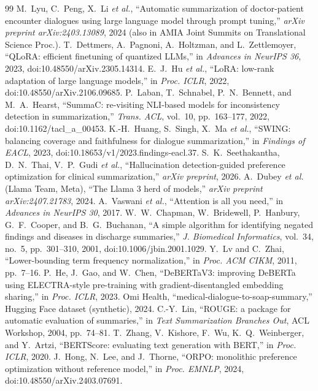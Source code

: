 \documentclass[conference]{IEEEtran}
\begin{document}
\begin{thebibliography}{99}
 M.~Lyu, C.~Peng, X.~Li \emph{et al.}, ``Automatic summarization of doctor-patient encounter dialogues using large language model through prompt tuning,'' \emph{arXiv preprint arXiv:2403.13089}, 2024 (also in AMIA Joint Summits on Translational Science Proc.).
 T.~Dettmers, A.~Pagnoni, A.~Holtzman, and L.~Zettlemoyer, ``QLoRA: efficient finetuning of quantized LLMs,'' in \emph{Advances in NeurIPS 36}, 2023, doi:10.48550/arXiv.2305.14314.
 E.~J.~Hu \emph{et al.}, ``LoRA: low-rank adaptation of large language models,'' in \emph{Proc. ICLR}, 2022, doi:10.48550/arXiv.2106.09685.
 P.~Laban, T.~Schnabel, P.~N.~Bennett, and M.~A.~Hearst, ``SummaC: re-visiting NLI-based models for inconsistency detection in summarization,'' \emph{Trans. ACL}, vol.~10, pp.~163--177, 2022, doi:10.1162/tacl\_a\_00453.
 K.-H.~Huang, S.~Singh, X.~Ma \emph{et al.}, ``SWING: balancing coverage and faithfulness for dialogue summarization,'' in \emph{Findings of EACL}, 2023, doi:10.18653/v1/2023.findings-eacl.37.
 S.~K.~Seethakantha, D.~N.~Thai, V.~P.~Gudi \emph{et al.}, ``Hallucination detection-guided preference optimization for clinical summarization,'' \emph{arXiv preprint}, 2026.
 A.~Dubey \emph{et al.} (Llama Team, Meta), ``The Llama 3 herd of models,'' \emph{arXiv preprint arXiv:2407.21783}, 2024.
 A.~Vaswani \emph{et al.}, ``Attention is all you need,'' in \emph{Advances in NeurIPS 30}, 2017.
 W.~W.~Chapman, W.~Bridewell, P.~Hanbury, G.~F.~Cooper, and B.~G.~Buchanan, ``A simple algorithm for identifying negated findings and diseases in discharge summaries,'' \emph{J. Biomedical Informatics}, vol.~34, no.~5, pp.~301--310, 2001, doi:10.1006/jbin.2001.1029.
 Y.~Lv and C.~Zhai, ``Lower-bounding term frequency normalization,'' in \emph{Proc. ACM CIKM}, 2011, pp.~7--16.
 P.~He, J.~Gao, and W.~Chen, ``DeBERTaV3: improving DeBERTa using ELECTRA-style pre-training with gradient-disentangled embedding sharing,'' in \emph{Proc. ICLR}, 2023.
 Omi Health, ``medical-dialogue-to-soap-summary,'' Hugging Face dataset (synthetic), 2024.
 C.-Y.~Lin, ``ROUGE: a package for automatic evaluation of summaries,'' in \emph{Text Summarization Branches Out}, ACL Workshop, 2004, pp.~74--81.
 T.~Zhang, V.~Kishore, F.~Wu, K.~Q.~Weinberger, and Y.~Artzi, ``BERTScore: evaluating text generation with BERT,'' in \emph{Proc. ICLR}, 2020.
 J.~Hong, N.~Lee, and J.~Thorne, ``ORPO: monolithic preference optimization without reference model,'' in \emph{Proc. EMNLP}, 2024, doi:10.48550/arXiv.2403.07691.
\end{thebibliography}
\end{document}
